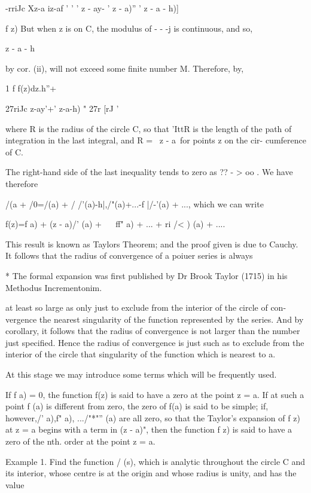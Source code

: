 {{ -rriJc Xz-a iz-af ' ' ' z - ay- ' z - a)'' ' z - a - h)]

f z) But when z is on C, the modulus of - - -j is continuous, and so,

z - a - h

by cor. (ii), will not exceed some finite number M. Therefore,
by,

1 f f(z)dz.h''+

27riJc z-ay'+' z-a-h) " 27r [rJ '

where R is the radius of the circle C, so that 'IttR is the length of
the path of integration in the last integral, and R = \ z - a\ for
points z on the cir- cumference of C.

The right-hand side of the last inequality tends to zero as ?? - > oo
. We have therefore

/(a + /0=/(a) + / /'(a)-h|,/"(a)+...-f |/-'(a) + ..., which we can
write

f(z)=f a) + (z - a)/' (a) + ~ ~ff" a) + ... + ri /< ) (a) + ....

This result is known as Taylors Theorem; and the proof given is due
to Cauchy. It follows that the radius of convergence of a poiuer
series is always

* The formal expansion was first published by Dr Brook Taylor (1715)
in his Methodus Incrementonim.

%
%

at least so large as only just to exclude from the interior of the
circle of con- vergence the nearest singularity of the function
represented by the series. And by corollary, it follows that the
radius of convergence is not larger than the number just specified.
Hence the radius of convergence is just such as to exclude from the
interior of the circle that singularity of the function which is
nearest to a.

At this stage we may introduce some terms which will be frequently
used.

If f a) = 0, the function f(z) is said to have a zero at the point z =
a. If at such a point f (a) is different from zero, the zero of f(a)
is said to be simple; if, however,/' a),f" a), .../"*"'' (a) are all
zero, so that the Taylor's expansion of f z) at z = a begins with a
term in (z - a)", then the function f z) is said to have a zero of the
nth. order at the point z = a.

Example 1. Find the function / (s), which is analytic throughout the
circle C and its interior, whose centre is at the origin and whose
radius is unity, and has the value

}}
